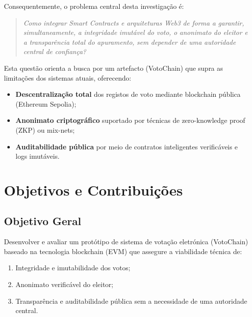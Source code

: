 Consequentemente, o problema central desta investigação é:

\begin{quote}
\textit{Como integrar Smart Contracts e arquiteturas Web3 de forma a garantir, simultaneamente, a integridade imutável do voto, o anonimato do eleitor e a transparência total do apuramento, sem depender de uma autoridade central de confiança?}
\end{quote}

Esta questão orienta a busca por um artefacto (VotoChain) que supra as limitações dos sistemas atuais, oferecendo:
\begin{itemize}
    \item \textbf{Descentraliza{\c{c}}{\~a}o total} dos registos de voto mediante blockchain p{\'u}blica (Ethereum Sepolia);
    \item \textbf{Anonimato criptográfico} suportado por técnicas de zero-knowledge proof (ZKP) ou mix-nets;
    \item \textbf{Auditabilidade pública} por meio de contratos inteligentes verificáveis e logs imutáveis.
\end{itemize}

\section{Objetivos e Contribuições}

\subsection{Objetivo Geral}
Desenvolver e avaliar um protótipo de sistema de votação eletrónica (VotoChain) baseado na tecnologia blockchain (EVM) que assegure a viabilidade técnica de:
\begin{enumerate}
    \item Integridade e imutabilidade dos votos;
    \item Anonimato verificável do eleitor;
    \item Transparência e auditabilidade pública sem a necessidade de uma autoridade central.
\end{enumerate}

